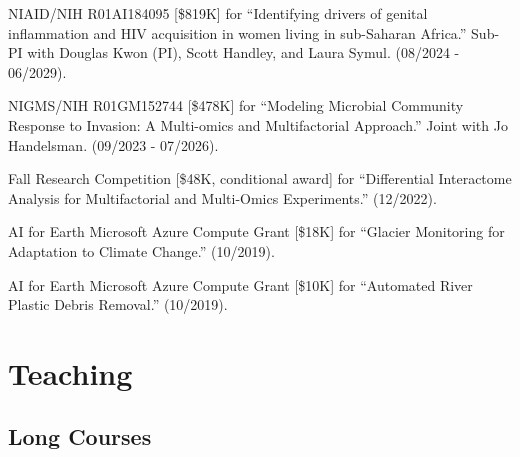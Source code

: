 \documentclass[letterpaper]{article}
\renewenvironment{itemize}{
  \begin{list}{}{
    \setlength{\leftmargin}{1.5em}
  }
}{
  \end{list}
}
\begin{document}
\begin{itemize}
\item NIAID/NIH R01AI184095 [\$819K] for ``Identifying drivers of genital inflammation and HIV acquisition in women living in sub-Saharan Africa.'' Sub-PI with Douglas Kwon (PI), Scott Handley, and Laura Symul. (08/2024 - 06/2029).
\item NIGMS/NIH R01GM152744 [\$478K] for ``Modeling Microbial Community Response to Invasion: A Multi-omics and Multifactorial Approach.'' Joint with Jo Handelsman. (09/2023 - 07/2026).
\item Fall Research Competition [\$48K, conditional award] for ``Differential Interactome Analysis for Multifactorial and Multi-Omics Experiments.'' (12/2022).
\item AI for Earth Microsoft Azure Compute Grant [\$18K] for ``Glacier Monitoring for Adaptation to Climate Change.'' (10/2019).
\item AI for Earth Microsoft Azure Compute Grant [\$10K] for ``Automated River Plastic Debris Removal.'' (10/2019).
\end{itemize}

\section*{Teaching}

\subsection*{Long Courses}
\end{document}
